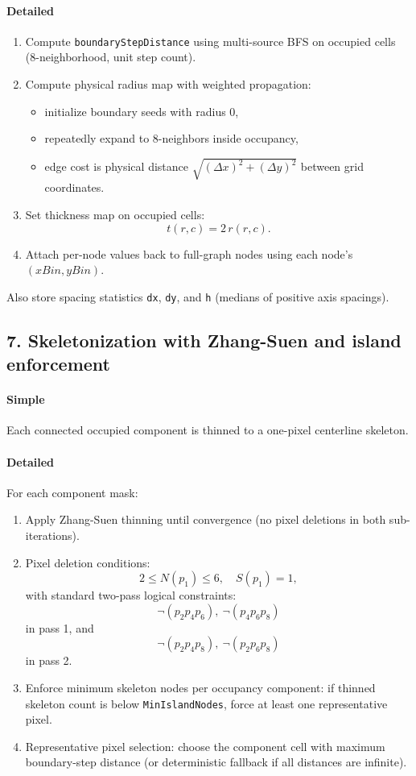 \documentclass[11pt]{article}
\begin{document}
\paragraph{Detailed}
\begin{enumerate}
  \item Compute \texttt{boundaryStepDistance} using multi-source BFS on occupied cells
  (8-neighborhood, unit step count).
  \item Compute physical radius map with weighted propagation:
  \begin{itemize}
    \item initialize boundary seeds with radius 0,
    \item repeatedly expand to 8-neighbors inside occupancy,
    \item edge cost is physical distance
    \(\sqrt{(\Delta x)^2 + (\Delta y)^2}\) between grid coordinates.
  \end{itemize}
  \item Set thickness map on occupied cells:
  \[
  t(r,c) = 2\,r(r,c).
  \]
  \item Attach per-node values back to full-graph nodes using each node's \((xBin,yBin)\).
\end{enumerate}

Also store spacing statistics \texttt{dx}, \texttt{dy}, and \texttt{h} (medians of positive axis spacings).

\subsection*{7. Skeletonization with Zhang-Suen and island enforcement}
\paragraph{Simple}
Each connected occupied component is thinned to a one-pixel centerline skeleton.

\paragraph{Detailed}
For each component mask:
\begin{enumerate}
  \item Apply Zhang-Suen thinning until convergence (no pixel deletions in both sub-iterations).
  \item Pixel deletion conditions:
  \[
  2 \le N(p_1) \le 6, \quad S(p_1)=1,
  \]
  with standard two-pass logical constraints:
  \[
  \neg(p_2p_4p_6), \ \neg(p_4p_6p_8)
  \]
  in pass 1, and
  \[
  \neg(p_2p_4p_8), \ \neg(p_2p_6p_8)
  \]
  in pass 2.
  \item Enforce minimum skeleton nodes per occupancy component:
  if thinned skeleton count is below \texttt{MinIslandNodes}, force at least one representative pixel.
  \item Representative pixel selection:
  choose the component cell with maximum boundary-step distance
  (or deterministic fallback if all distances are infinite).
\end{enumerate}
\end{document}
